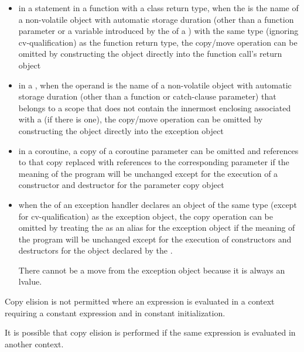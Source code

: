 \begin{itemize}
\item in a  statement in a function with a class return type,
when the  is the name of a non-volatile
object with automatic storage duration (other than a function parameter or a variable
introduced by the  of a
)
with the same type (ignoring cv-qualification) as
the function return type, the copy/move operation can be
omitted by constructing the object directly
into the function call's return object

\item in a , when the operand
is the name of a non-volatile object with automatic storage duration
(other than a function or catch-clause parameter)
that belongs to a scope that does not contain
the innermost enclosing 
associated with a  (if there is one),
the copy/move operation can be omitted by
constructing the object directly into the exception object

\item in a coroutine, a copy of a coroutine parameter
can be omitted and references to that copy replaced with references to the
corresponding parameter if the meaning of the program will be unchanged except for
the execution of a constructor and destructor for the parameter copy object

\item when the  of an
exception handler declares an object of the same
type (except for cv-qualification) as the exception
object, the copy operation can be omitted by treating
the  as an alias for the exception
object if the meaning of the program will be unchanged except for the execution
of constructors and destructors for the object declared by the
.
\begin{note}
There cannot be a move from the exception object because it is
always an lvalue.
\end{note}
\end{itemize}
Copy elision is not permitted
where an expression is evaluated in a context
requiring a constant expression
and in constant initialization.
\begin{note}
It is possible that copy elision is performed
if the same expression
is evaluated in another context.
\end{note}

